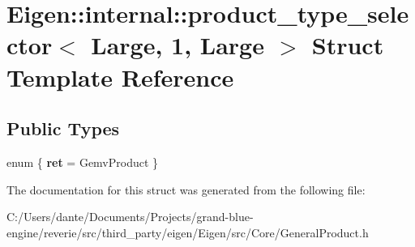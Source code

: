 \hypertarget{struct_eigen_1_1internal_1_1product__type__selector_3_01_large_00_011_00_01_large_01_4}{}\section{Eigen\+::internal\+::product\+\_\+type\+\_\+selector$<$ Large, 1, Large $>$ Struct Template Reference}
\label{struct_eigen_1_1internal_1_1product__type__selector_3_01_large_00_011_00_01_large_01_4}
\subsection*{Public Types}
\begin{DoxyCompactItemize}
\item 
\mbox{\label{struct_eigen_1_1internal_1_1product__type__selector_3_01_large_00_011_00_01_large_01_4_ae6b36f36b4f6de5ff720b03417165dfb}} 
enum \{ {\bfseries ret} = Gemv\+Product
 \}
\end{DoxyCompactItemize}


The documentation for this struct was generated from the following file\+:\begin{DoxyCompactItemize}
\item 
C\+:/\+Users/dante/\+Documents/\+Projects/grand-\/blue-\/engine/reverie/src/third\+\_\+party/eigen/\+Eigen/src/\+Core/General\+Product.\+h\end{DoxyCompactItemize}
